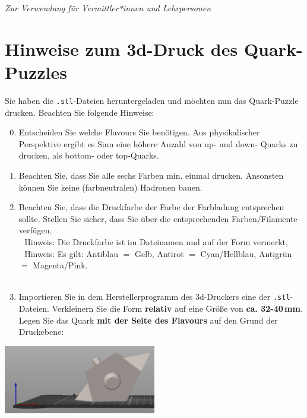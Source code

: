 
\hfill\textit{Zur Verwendung für Vermittler*innen und Lehrpersonen}
\section*{Hinweise zum 3d-Druck des Quark-Puzzles}
Sie haben die \texttt{.stl}-Dateien heruntergeladen und möchten nun das Quark-Puzzle drucken. Beachten Sie folgende Hinweise:
\begin{enumerate}\setcounter{enumi}{-1}
    \item Entscheiden Sie welche Flavours Sie benötigen. Aus physikalischer Perspektive ergibt es Sinn eine höhere Anzahl von up- und down- Quarks zu drucken, als bottom- oder top-Quarks.\setcounter{enumi}{-1}
    \item Beachten Sie, dass Sie alle sechs Farben min. einmal drucken. Ansonsten können Sie keine (farbneutralen) Hadronen bauen. \setcounter{enumi}{-1}
    \item Beachten Sie, dass die Druckfarbe der Farbe der Farbladung entsprechen sollte. Stellen Sie sicher, dass Sie über die entsprechenden Farben/Filamente verfügen. \\ \,~Hinweis: Die Druckfarbe ist im Dateinamen und auf der Form vermerkt, \\ \,~Hinweis: Es gilt: Antiblau $=$ Gelb, Antirot $=$ Cyan/Hellblau, Antigrün $=$ Magenta/Pink. \\ \,
    \hline 
    \item Importieren Sie in dem Herstellerprogramm des 3d-Druckers eine der \texttt{.stl}-Dateien.  Verkleinern Sie die Form \textbf{relativ} auf eine Größe von \textbf{ca. 32-40\,mm}. Legen Sie das Quark   \textbf{mit der Seite des Flavours} auf den Grund der Druckebene:
\end{enumerate}
\begin{center}
  \includegraphics[width=0.5\textwidth]{Pictures Quark Puzzle/2023-11-01 15_13_48-Start.png}  
\end{center}
